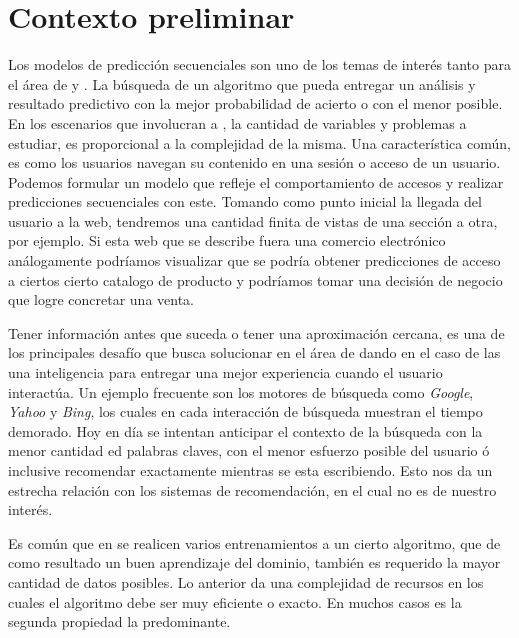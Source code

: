 %
%
%
%


\section{Contexto preliminar}\label{sec:preliminar}

Los modelos de predicción secuenciales son uno de los temas de interés tanto para el área de \machinelearning  y \datacompression. La búsqueda de un algoritmo que pueda entregar un análisis  y resultado predictivo con la mejor probabilidad de acierto o con el menor posible.
En los escenarios que involucran a \webs, la cantidad de variables y problemas a estudiar, es proporcional a la complejidad de la misma. 
Una característica común, es como los usuarios navegan su contenido en una sesión o acceso de un usuario. Podemos formular un modelo que refleje el comportamiento de accesos y realizar predicciones secuenciales con este. Tomando como punto inicial la llegada del usuario a la web, tendremos una cantidad finita de vistas de una sección a otra, por ejemplo. Si esta web que se describe fuera una comercio electrónico análogamente podríamos visualizar que se podría obtener predicciones de acceso a ciertos cierto catalogo de producto y podríamos tomar una decisión de negocio que logre concretar una venta. 

Tener información antes que suceda o tener una aproximación cercana, es una de los principales desafío que busca solucionar en el área  de \machinelearning dando en el caso de las \webs una inteligencia para entregar una mejor experiencia cuando el usuario interactúa. Un ejemplo frecuente son los motores de búsqueda como \emph{Google}, \emph{Yahoo} y \emph{Bing}, los cuales en cada interacción de búsqueda muestran el tiempo demorado. Hoy en día se intentan anticipar el contexto de la búsqueda con la menor cantidad ed palabras claves, con el menor esfuerzo posible del usuario ó inclusive recomendar exactamente mientras se esta escribiendo. Esto nos da un estrecha relación con los sistemas de recomendación, en el cual no es de nuestro interés. 

Es común que en \machinelearning se realicen varios entrenamientos a un cierto algoritmo, que de como resultado un buen aprendizaje del dominio, también es requerido la mayor cantidad de datos posibles. Lo anterior da una complejidad de recursos en los cuales el algoritmo debe ser muy eficiente o exacto. En muchos casos es la segunda propiedad la predominante. 


